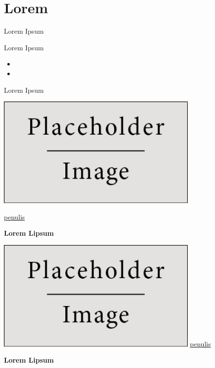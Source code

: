 \documentclass[main.tex]{subfiles}
\begin{document}
\section{Lorem}

\begin{frame}{Lorem Ipsum}
\end{frame}

\begin{frame}{Lorem Ipsum}
	\vspace{4pt}
	\begin{itemize}
		\item \lipsum[10][1-2]
		\item \lipsum[1][1-2]
	\end{itemize}

\end{frame}

\begin{frame}{Lorem Ipsum}
	\begin{center}
		\includegraphics[height=5.5cm]{figures/placeholder}

		{\tiny \textcolor{digiPH_darkorange}{\lipsum[1][1] \url{penulis}}}
	\end{center}
	\begin{center}
		\textbf{Lorem Lipsum} \lipsum[1][1]

	\end{center}
\end{frame}

\begin{frame}
	\begin{center}
		\includegraphics[height=5.5cm]{figures/placeholder}
		{\tiny \textcolor{digiPH_darkorange}{\lipsum[1][1] \url{penulis}}}
	\end{center}
	\begin{center}
		{\small\textbf{Lorem Lipsum} \lipsum[1][1]}
	\end{center}
\end{frame}
\end{document}
